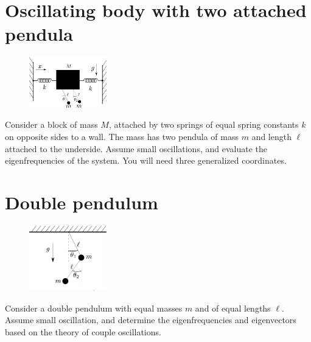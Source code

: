 \documentclass{article}
\begin{document}
    \section{Oscillating body with two attached pendula}
    \begin{figure}
        \vspace{-0.5cm}
        \includegraphics[width=0.3\textwidth]{figures/figure_3.pdf}
        \vspace{-1.5cm}
    \end{figure}
    Consider a block of mass $M$, attached by two springs of equal spring constants $k$ on opposite sides to a wall. The mass has two pendula of mass $m$ and length $\ell$ attached to the underside. Assume small oscillations, and evaluate the eigenfrequencies of the system. You will need three generalized coordinates.

    \section{Double pendulum}
    \begin{figure}
        \vspace{-0.5cm}
        \includegraphics[width=0.3\textwidth]{figures/figure_4.pdf}
    \end{figure}
    Consider a double pendulum with equal masses $m$ and of equal lengths $\ell$. Assume small oscillation, and determine the eigenfrequencies and eigenvectors based on the theory of couple oscillations.
\end{document}
